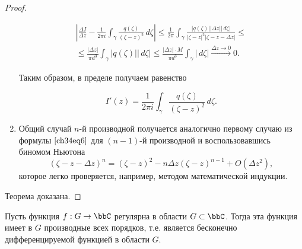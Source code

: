 \begin{proof}
\begin{enumerate}
\begin{multline*}
\left| \frac{\Delta I}{\Delta z} - \frac{1}{2\pi i} \int_\gamma \frac{q(\zeta)}{(\zeta - z)^2}\,d\zeta \right| 
\le \frac{1}{2\pi} \int_\gamma \frac{|q(\zeta)||\Delta z||\,d\zeta|}{|\zeta - z|^2|\zeta - z - \Delta z|} \le \\
\le \frac{|\Delta z|}{\pi d^3} \int_\gamma |q(\zeta)||\,d\zeta| 
\le \frac{|\Delta z| \cdot M}{\pi d^3} \int_\gamma |\,d\zeta| \xrightarrow{\Delta z \to 0} 0.
\end{multline*}

Таким образом, в пределе получаем равенство

\begin{equation} \label{ch34eq9}
I'(z) = \frac{1}{2\pi i} \int_\gamma \frac{q(\zeta)}{(\zeta - z)^2} \,d\zeta.
\end{equation}

\item 
Общий случай $n$-й производной получается аналогично первому случаю из формулы $\eqref{ch34eq6}$ для $(n - 1)$-й производной и воспользовавшись биномом Ньютона
$$
(\zeta - z - \Delta z)^n = (\zeta - z)^2 - n \Delta z (\zeta - z)^{n - 1} + O(\Delta z^2),
$$
которое легко проверяется, например, методом математической индукции.
\end{enumerate}
\noindent
Теорема доказана.
\end{proof}

\begin{thm} \label{ch34Thm3}
Пусть функция $f : G \to \bbC$ регулярна в области $G \subset \bbC$. Тогда эта функция имеет в $G$ производные всех порядков, т.е. является бесконечно дифференцируемой функцией в области $G$.
\end{thm}


